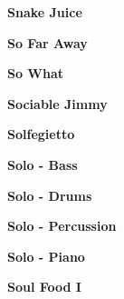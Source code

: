 \newline
\vspace{10pt} 
\begin{center}\textbf{Snake Juice}\end{center}
\newline
\vspace{10pt} 
\begin{center}\textbf{So Far Away}\end{center}
\newline
\vspace{10pt} 
\begin{center}\textbf{So What}\end{center}
\newline
\vspace{10pt} 
\begin{center}\textbf{Sociable Jimmy}\end{center}
\newline
\vspace{10pt} 
\begin{center}\textbf{Solfegietto}\end{center}
\newline
\vspace{10pt} 
\begin{center}\textbf{Solo - Bass}\end{center}
\newline
\vspace{10pt} 
\begin{center}\textbf{Solo - Drums}\end{center}
\newline
\vspace{10pt} 
\begin{center}\textbf{Solo - Percussion}\end{center}
\newline
\vspace{10pt} 
\begin{center}\textbf{Solo - Piano}\end{center}
\newline
\vspace{10pt} 
\begin{center}\textbf{Soul Food I}\end{center}
